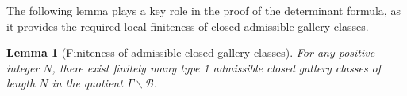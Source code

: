 \documentclass[11pt]{amsart}
\newtheorem{lem}[thm]{Lemma}
\theoremstyle{definition}
\theoremstyle{remark}
\numberwithin{equation}{section}
\begin{document}
\medskip
\noindent



The following lemma plays a key role in the proof of the determinant formula, as it
provides the required local finiteness of closed admissible gallery classes.



\begin{lem}[Finiteness of admissible closed gallery classes]\label{lem:3.1}For any positive integer $N$, there exist finitely many type 1 admissible closed gallery classes of length $N$ in the quotient $\Gamma\backslash\mathcal{B}$.
\end{lem}
\end{document}
